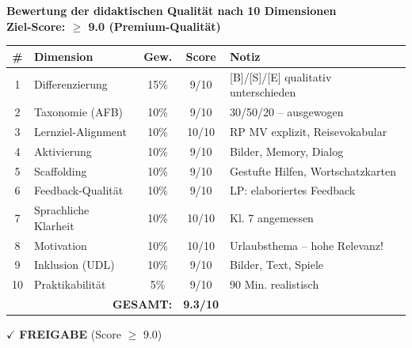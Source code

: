 \documentclass[11pt,a4paper]{article}
\begin{document}
\begin{scorebox}
\textbf{Bewertung der didaktischen Qualität nach 10 Dimensionen}\\
\textbf{Ziel-Score: $\geq$ 9.0 (Premium-Qualität)}

\vspace{1em}
\begin{tabular}{|c|l|c|c|p{4cm}|}
\hline
\textbf{\#} & \textbf{Dimension} & \textbf{Gew.} & \textbf{Score} & \textbf{Notiz} \\
\hline
1 & Differenzierung & 15\% & 9/10 & [B]/[S]/[E] qualitativ unterschieden \\
\hline
2 & Taxonomie (AFB) & 10\% & 9/10 & 30/50/20 -- ausgewogen \\
\hline
3 & Lernziel-Alignment & 10\% & 10/10 & RP MV explizit, Reisevokabular \\
\hline
4 & Aktivierung & 10\% & 9/10 & Bilder, Memory, Dialog \\
\hline
5 & Scaffolding & 10\% & 9/10 & Gestufte Hilfen, Wortschatzkarten \\
\hline
6 & Feedback-Qualität & 10\% & 9/10 & LP: elaboriertes Feedback \\
\hline
7 & Sprachliche Klarheit & 10\% & 10/10 & Kl. 7 angemessen \\
\hline
8 & Motivation & 10\% & 10/10 & Urlaubsthema -- hohe Relevanz! \\
\hline
9 & Inklusion (UDL) & 10\% & 9/10 & Bilder, Text, Spiele \\
\hline
10 & Praktikabilität & 5\% & 9/10 & 90 Min. realistisch \\
\hline
\multicolumn{3}{|r|}{\textbf{GESAMT:}} & \textbf{9.3/10} & \\
\hline
\end{tabular}

\vspace{1em}
$\checkmark$ \textcolor{successgreen}{\textbf{FREIGABE} (Score $\geq$ 9.0)}
\end{scorebox}
\end{document}
